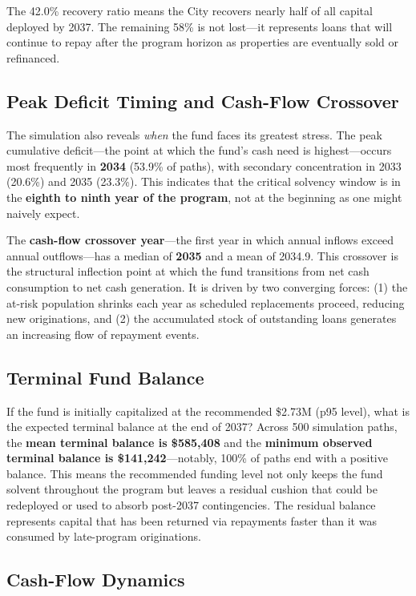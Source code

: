 \documentclass[11pt, letterpaper]{article}
\begin{document}
The 42.0\% recovery ratio means the City recovers nearly half of all capital deployed by 2037. The remaining 58\% is not lost---it represents loans that will continue to repay after the program horizon as properties are eventually sold or refinanced.

\subsection{Peak Deficit Timing and Cash-Flow Crossover}

The simulation also reveals \emph{when} the fund faces its greatest stress. The peak cumulative deficit---the point at which the fund's cash need is highest---occurs most frequently in \textbf{2034} (53.9\% of paths), with secondary concentration in 2033 (20.6\%) and 2035 (23.3\%). This indicates that the critical solvency window is in the \textbf{eighth to ninth year of the program}, not at the beginning as one might naively expect.

The \textbf{cash-flow crossover year}---the first year in which annual inflows exceed annual outflows---has a median of \textbf{2035} and a mean of 2034.9. This crossover is the structural inflection point at which the fund transitions from net cash consumption to net cash generation. It is driven by two converging forces: (1) the at-risk population shrinks each year as scheduled replacements proceed, reducing new originations, and (2) the accumulated stock of outstanding loans generates an increasing flow of repayment events.

\subsection{Terminal Fund Balance}

If the fund is initially capitalized at the recommended \$2.73M (p95 level), what is the expected terminal balance at the end of 2037? Across 500 simulation paths, the \textbf{mean terminal balance is \$585{,}408} and the \textbf{minimum observed terminal balance is \$141{,}242}---notably, 100\% of paths end with a positive balance. This means the recommended funding level not only keeps the fund solvent throughout the program but leaves a residual cushion that could be redeployed or used to absorb post-2037 contingencies. The residual balance represents capital that has been returned via repayments faster than it was consumed by late-program originations.

\subsection{Cash-Flow Dynamics}
\end{document}
